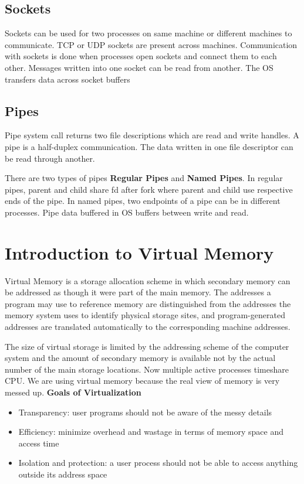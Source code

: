 \documentclass{article}
\begin{document}
\subsection{Sockets}
Sockets can be used for two processes on same machine or different machines to communicate. TCP or UDP sockets are present across machines. Communication with sockets is done when processes open sockets and connect them to each other. Messages written into one socket can be read from another. The OS transfers data across socket buffers
\subsection{Pipes}
Pipe system call returns two file descriptions which are read and write handles. A pipe is a half-duplex communication. The data written in one file descriptor can be read through another.

There are two types of pipes \textbf{Regular Pipes} and \textbf{Named Pipes}. In regular pipes, parent and child share fd after fork where parent and child use respective ends of the pipe. In named pipes, two endpoints of a pipe can be in different processes. Pipe data buffered in OS buffers between write and read.

\section{Introduction to Virtual Memory}
Virtual Memory is a storage allocation scheme in which secondary memory can be addressed as though it were part of the main memory. The addresses a program may use to reference memory are distinguished from the addresses the memory system uses to identify physical storage sites, and program-generated addresses are translated automatically to the corresponding machine addresses. 

The size of virtual storage is limited by the addressing scheme of the computer system and the amount of secondary memory is available not by the actual number of the main storage locations.
Now multiple active processes timeshare CPU. We are using virtual memory because the real view of memory is very messed up.
\textbf{Goals of Virtualization}
\begin{itemize}
    \item Transparency: user programs should not be aware of the messy details
    \item Efficiency: minimize overhead and wastage in terms of memory space and access time
    \item Isolation and protection: a user process should not be able to access anything outside its address space
\end{itemize}
\end{document}
